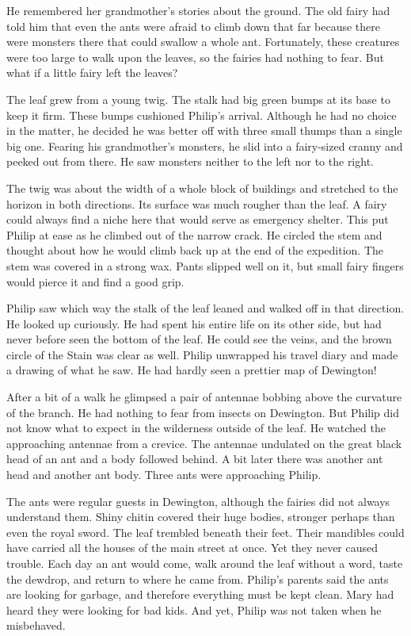 \documentclass[10pt, draft]{memoir}
\begin{document}
He remembered her grandmother's stories about the ground. The old
fairy had told him that even the ants were afraid to climb down that far
because there were monsters there that could swallow a whole ant. Fortunately,
these creatures were too large to walk upon the leaves, so the fairies had
nothing to fear. But what if a little fairy left the leaves?

The leaf grew from a young twig. The stalk had big green bumps at its base to
keep it firm. These bumps cushioned Philip's arrival. Although he had no choice
in the matter, he decided he was better off with three small thumps than a
single big one. Fearing his grandmother's monsters, he slid into a fairy-sized
cranny and peeked out from there. He saw monsters neither to the left nor to
the right.

The twig was about the width of a whole block of buildings and stretched to the
horizon in both directions. Its surface was much rougher than the leaf. A fairy
could always find a niche here that would serve as emergency shelter. This put
Philip at ease as he climbed out of the narrow crack. He circled the stem and
thought about how he would climb back up at the end of the expedition. The stem
was covered in a strong wax. Pants slipped well on it, but small fairy fingers
would pierce it and find a good grip.

Philip saw which way the stalk of the leaf leaned and walked off in that
direction. He looked up curiously. He had spent his entire life on its other
side, but had never before seen the bottom of the leaf. He could see the veins,
and the brown circle of the Stain was clear as well. Philip unwrapped his
travel diary and made a drawing of what he saw. He had hardly seen a prettier
map of Dewington!

After a bit of a walk he glimpsed a pair of antennae bobbing above the
curvature of the branch. He had nothing to fear from insects on Dewington. But
Philip did not know what to expect in the wilderness outside of the leaf. He
watched the approaching antennae from a crevice. The antennae undulated on the
great black head of an ant and a body followed behind. A bit later there was
another ant head and another ant body. Three ants were approaching Philip.

The ants were regular guests in Dewington, although the fairies did not always
understand them. Shiny chitin covered their huge bodies, stronger perhaps than
even the royal sword. The leaf trembled beneath their feet. Their mandibles
could have carried all the houses of the main street at once. Yet they never
caused trouble. Each day an ant would come, walk around the leaf without a
word, taste the dewdrop, and return to where he came from. Philip's parents
said the ants are looking for garbage, and therefore everything must be kept
clean. Mary had heard they were looking for bad kids. And yet, Philip was not
taken when he misbehaved.
\end{document}

